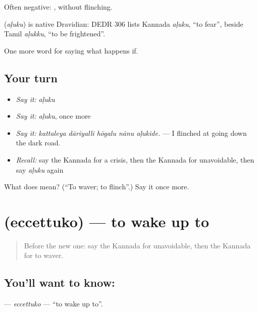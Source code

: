 Often negative: , without flinching.

\begin{cousinweb}
\textbf{} (\emph{aḷuku}) is native Dravidian: DEDR 306 lists Kannada \emph{aḷuku}, \textquotedblleft{}to fear\textquotedblright{}, beside Tamil \emph{aḷukku}, \textquotedblleft{}to be frightened\textquotedblright{}.
\end{cousinweb}

\begin{grammarlens}[title={What you've built}]
One more word for saying what happens if.
\end{grammarlens}

\subsection*{Your turn}
\begin{itemize}
\raggedright
  \item \emph{Say it:} \emph{aḷuku}
  \item \emph{Say it:} \emph{aḷuku}, once more
  \item \emph{Say it:} \emph{kattaleya dāriyalli hōgalu nānu aḷukide.} — I flinched at going down the dark road.
  \item \emph{Recall:} say the Kannada for a crisis, then the Kannada for unavoidable, then say \emph{aḷuku} again
\end{itemize}

\begin{tcolorbox}[breakable,colback=teal!4,colframe=teal!35!black,title={Before you move on}]
What does  mean? (\textquotedblleft{}To waver; to flinch\textquotedblright{}.) Say it once more.
\end{tcolorbox}
\section[\texorpdfstring{\kn{ಎಚ್ಚೆತ್ತುಕೊ} (eccettuko)}{ಎಚ್ಚೆತ್ತುಕೊ (eccettuko)}]{ (eccettuko) — to wake up to}

\label{lesson:KA-C420-eccettuko}



\begin{quote}
Before the new one: say the Kannada for unavoidable, then the Kannada for to waver.
\end{quote}

\subsection*{You'll want to know: }
\textbf{} — \emph{eccettuko} — \textquotedblleft{}to wake up to\textquotedblright{}.


